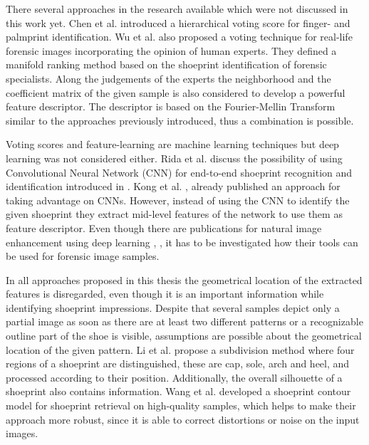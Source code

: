 \documentclass[draft,final]{vutinfth} %
\begin{document}
\par
There several approaches in the research available which were not discussed in this work yet.
Chen et al. \cite{chen2013hierarchical} introduced a hierarchical voting score for finger- and palmprint identification.
Wu et al. \cite{wu2019losgsr} also proposed a voting technique for real-life forensic images incorporating the opinion of human experts.
They defined a manifold ranking method based on the shoeprint identification of forensic specialists.
Along the judgements of the experts the neighborhood and the coefficient matrix of the given sample is also considered to develop a powerful feature descriptor.
The descriptor is based on the Fourier-Mellin Transform similar to the approaches previously introduced, thus a combination is possible.
\par
Voting scores and feature-learning are machine learning techniques but deep learning \cite{lecun2015deep} was not considered either.
Rida et al. \cite{rida2019forensic} discuss the possibility of using Convolutional Neural Network (CNN) for end-to-end shoeprint recognition and identification introduced in \cite{lecun1998gradient}.
Kong et al. \cite{kong2017cross}, \cite{kong2019cross} already published an approach for taking advantage on CNNs.
However, instead of using the CNN to identify the given shoeprint they extract mid-level features of the network to use them as feature descriptor.
Even though there are publications for natural image enhancement using deep learning \cite{gharbi2017deep}, \cite{chen2018deep}, it has to be investigated how their tools can be used for forensic image samples.
\par
In all approaches proposed in this thesis the geometrical location of the extracted features is disregarded, even though it is an important information while identifying shoeprint impressions.
Despite that several samples depict only a partial image as soon as there are at least two different patterns or a recognizable outline part of the shoe is visible, assumptions are possible about the geometrical location of the given pattern.
Li et al. \cite{li2015secondary} propose a subdivision method where four regions of a shoeprint are distinguished, these are cap, sole, arch and heel, and processed according to their position.
Additionally, the overall silhouette of a shoeprint also contains information.
Wang et al. \cite{wang2014automatic} developed a shoeprint contour model for shoeprint retrieval on high-quality samples, which helps to make their approach more robust, since it is able to correct distortions or noise on the input images.
\end{document}
